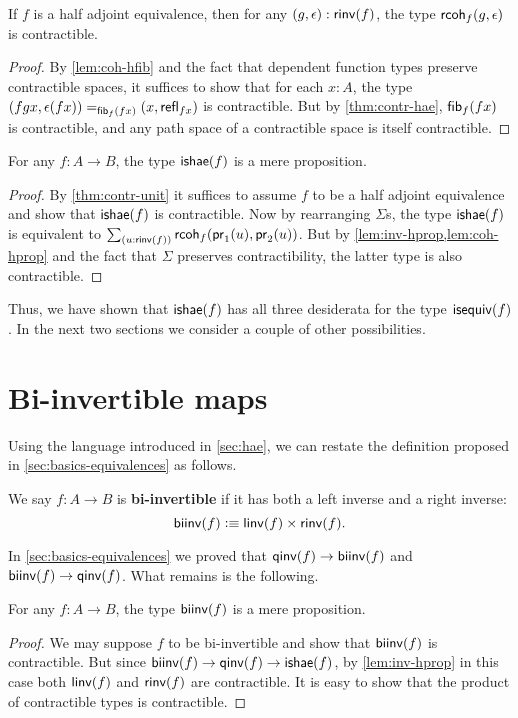 \begin{lem}\label{lem:coh-hprop}
  If $f$ is a half adjoint equivalence, then for any $(g,\epsilon) : \rinv(f)$, the type $\rcoh{f}{g}{\epsilon}$ is contractible.
\end{lem}
\begin{proof}
  By \autoref{lem:coh-hfib} and the fact that dependent function types preserve contractible spaces, it suffices to show that for each $x:A$, the type $\id[\hfib{f}{fx}]{(fgx,\epsilon(fx))}{(x,\refl{fx})}$ is contractible.
  But by \autoref{thm:contr-hae}, $\hfib{f}{fx}$ is contractible, and any path space of a contractible space is itself contractible.
\end{proof}

\begin{thm}\label{thm:hae-hprop}
  For any $f : A \to B$, the type $\ishae(f)$ is a mere proposition.
\end{thm}
\begin{proof}
  By \autoref{thm:contr-unit} it suffices to assume $f$ to be a half adjoint equivalence and show that $\ishae(f)$ is contractible.
  Now by rearranging $\Sigma$s, the type $\ishae(f)$ is equivalent to $\sm{u : \rinv(f)} \rcoh{f}{\proj{1}(u)}{\proj{2}(u)}$.
  But by \cref{lem:inv-hprop,lem:coh-hprop} and the fact that $\Sigma$ preserves contractibility, the latter type is also contractible.
\end{proof}

Thus, we have shown that $\ishae(f)$ has all three desiderata for the type $\isequiv(f)$.
In the next two sections we consider a couple of other possibilities.


\section{Bi-invertible maps}
\label{sec:biinv}

Using the language introduced in \autoref{sec:hae}, we can restate the definition proposed in \autoref{sec:basics-equivalences} as follows.

\begin{defn}
  We say $f:A\to B$ is \textbf{bi-invertible} if it has both a left inverse and a right inverse:
  \[ \biinv (f) \defeq \linv(f) \times \rinv(f). \]
\end{defn}

In \autoref{sec:basics-equivalences} we proved that $\qinv(f)\to\biinv(f)$ and $\biinv(f)\to\qinv(f)$.
What remains is the following.

\begin{thm}\label{thm:isprop-biinv}
  For any $f:A\to B$, the type $\biinv(f)$ is a mere proposition.
\end{thm}
\begin{proof}
  We may suppose $f$ to be bi-invertible and show that $\biinv(f)$ is contractible.
  But since $\biinv(f)\to\qinv(f) \to \ishae(f)$, by \autoref{lem:inv-hprop} in this case both $\linv(f)$ and $\rinv(f)$ are contractible.
  It is easy to show that the product of contractible types is contractible.
\end{proof}

